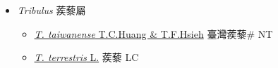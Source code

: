 
  \begin{itemize}
 \item[] \textit{Tribulus} 蒺藜屬
                    
  \begin{itemize}
        \item[] \href{http://www.theplantlist.org/tpl1.1/search?q=Tribulus+taiwanense}{\textit{T. taiwanense} T.C.Huang \& T.F.Hsieh}   臺灣蒺藜\# NT
        \item[] \href{http://www.theplantlist.org/tpl1.1/search?q=Tribulus+terrestris}{\textit{T. terrestris} L.}   蒺藜 LC
  \end{itemize}
  \end{itemize}
